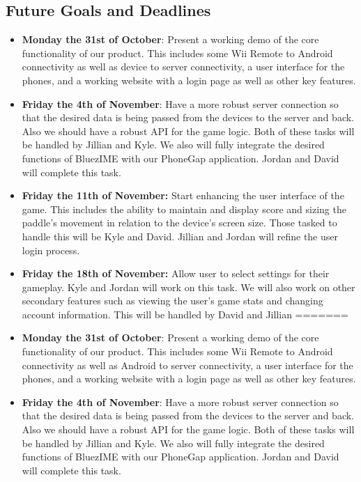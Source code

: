 \documentclass[12pt]{article}
\newenvironment{itemize*}%
  {\begin{itemize}%
  	\setlength{\parsep}{0pt}
    \setlength{\itemsep}{0pt}%
    \setlength{\parskip}{0pt}}%
  {\end{itemize}}
\begin{document}
\begin{itemize*}
\subsection{Future Goals and Deadlines}
\begin{itemize}
<<<<<<< HEAD
\item \textbf{Monday the 31st of October}: Present a working demo of the core functionality of our product.  This includes some Wii Remote to Android connectivity as well as device to server connectivity, a user interface for the phones, and a working website with a login page as well as other key features.

\item \textbf{Friday the 4th of November}: Have a more robust server connection so that the desired data is being passed from the devices to the server and back.  Also we should have a robust API for the game logic.  Both of these tasks will be handled by Jillian and Kyle.  We also will fully integrate the desired functions of BluezIME with our PhoneGap application.  Jordan and David will complete this task.

\item \textbf{Friday the 11th of November:} Start enhancing the user interface of the game.  This includes the ability to maintain and display score and sizing the paddle’s movement in relation to the device’s screen size.  Those tasked to handle this will be Kyle and David.  Jillian and Jordan will refine the user login process.

\item \textbf{Friday the 18th of November:} Allow user to select settings for their gameplay.  Kyle and Jordan will work on this task. We will also work on other secondary features such as viewing the user’s game stats and changing account information.  This will be handled by David and Jillian
=======
\item \textbf{Monday the 31st of October}: Present a working demo of the core functionality of our product.  This includes some Wii Remote to Android connectivity as well as Android to server connectivity, a user interface for the phones, and a working website with a login page as well as other key features.

\item \textbf{Friday the 4th of November}: Have a more robust server connection so that the desired data is being passed from the devices to the server and back.  Also we should have a robust API for the game logic.  Both of these tasks will be handled by Jillian and Kyle.  We also will fully integrate the desired functions of BluezIME with our PhoneGap application.  Jordan and David will complete this task.


\end{itemize}
\end{itemize*}
\end{document}

